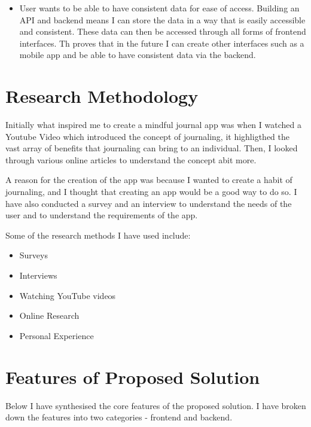 \begin{itemize}

            \item User wants to be able to have consistent data for ease of access. Building an API and backend means I can store the data in a way that is easily accessible and consistent. These data can then be accessed through all forms of frontend interfaces. Th proves that in the future I can create other interfaces such as a mobile app and be able to have consistent data via the backend.

    \end{itemize}




\section{Research Methodology}
Initially what inspired me to create a mindful journal app was when I watched a Youtube Video which introduced the concept of journaling, it highligthed the vast array of benefits that journaling can bring to an individual. Then, I looked through various online articles to understand the concept abit more. 

A reason for the creation of the app was because I wanted to create a habit of journaling, and I thought that creating an app would be a good way to do so. I have also conducted a survey and an interview to understand the needs of the user and to understand the requirements of the app.

Some of the research methods I have used include:
\begin{itemize}
  \item Surveys
  \item Interviews
  \item Watching YouTube videos
  \item Online Research
  \item Personal Experience
\end{itemize}

\section{Features of Proposed Solution}
Below I have synthesised the core features of the proposed solution. I have broken down the features into two categories - frontend and backend.

